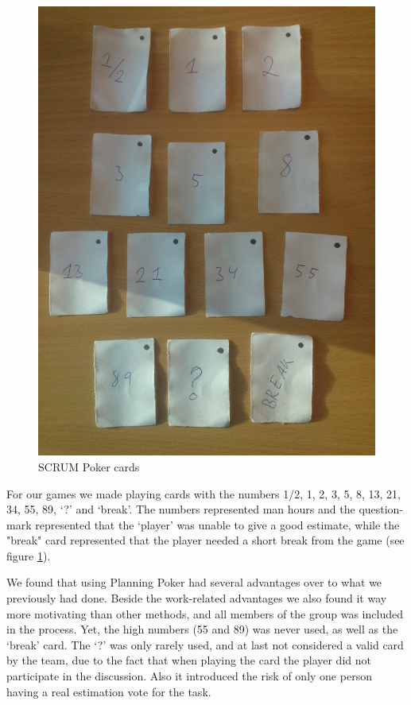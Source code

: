 \begin{figure}[H]
  \centering
  \includegraphics[width=\textwidth, angle=270]{illustrations/scrumPokerCards.jpg}
  \caption{SCRUM Poker cards}
  \label{fig:scrumPokerCards}
\end{figure}

For our games we made playing cards with the numbers 1/2, 1, 2, 3, 5, 8, 13, 21, 34, 55, 89, `?' and `break'. The numbers represented man hours and the question-mark represented that the `player' was unable to give a good estimate, while the "break" card represented that the player needed a short break from the game (see figure \ref{fig:scrumPokerCards}).

We found that using Planning Poker had several advantages over to what we previously had done. Beside the work-related advantages we also found it way more motivating than other methods, and all members of the group was included in the process. Yet, the high numbers (55 and 89) was never used, as well as the `break' card. The `?' was only rarely used, and at last not considered a valid card by the team, due to the fact that when playing the card the player did not participate in the discussion. Also it introduced the risk of only one person having a real estimation vote for the task.

